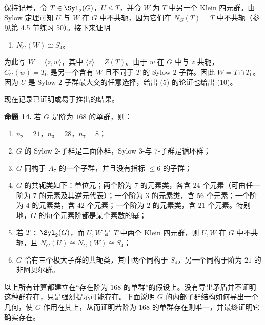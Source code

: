 保持记号，令 $T\in\Syl_2(G)$，$U\leq T$，并令 $W$ 为 $T$ 中另一个 Klein 四元群。由 Sylow 定理可知 $U$ 与 $W$ 在 $G$ 中不共轭，因为它们在 $N_G(T)=T$ 中不共轭（参见第 4.5 节练习 50）。接下来证明
\begin{enumerate}[label=(\arabic*),resume]
  \item $N_G(W)\cong S_4$。
\end{enumerate}
为此写 $W=\langle z,w\rangle$，其中 $\langle z\rangle=Z(T)$。由于 $w$ 在 $G$ 中与 $z$ 共轭，$C_G(w)=T_0$ 是另一个含有 $W$ 且不同于 $T$ 的 Sylow $2$-子群。因此 $W=T\cap T_0$。因为 $U$ 是 Sylow $2$-子群最大交的任意选择，给出 (5) 的论证也给出 (10)。

现在记录已证明或易于推出的结果。

\medskip
\noindent\textbf{命题 14.} 若 $G$ 是阶为 $168$ 的单群，则：
\begin{enumerate}[label=(\arabic*)]
  \item $n_2=21$，$n_3=28$，$n_7=8$；
  \item $G$ 的 Sylow $2$-子群是二面体群，Sylow $3$-与 $7$-子群是循环群；
  \item $G$ 同构于 $A_7$ 的一个子群，并且没有指标 $\leq6$ 的子群；
  \item $G$ 的共轭类如下：单位元；两个阶为 $7$ 的元素类，各含 $24$ 个元素（可由任一阶为 $7$ 的元素及其逆元代表）；一个阶为 $3$ 的元素类，含 $56$ 个元素；一个阶为 $4$ 的元素类，含 $42$ 个元素；一个阶为 $2$ 的元素类，含 $21$ 个元素。特别地，$G$ 的每个元素阶都是某个素数的幂；
  \item 若 $T\in\Syl_2(G)$，而 $U,W$ 是 $T$ 中两个 Klein 四元群，则 $U,W$ 在 $G$ 中不共轭，且 $N_G(U)\cong N_G(W)\cong S_4$；
  \item $G$ 恰有三个极大子群的共轭类，其中两个同构于 $S_4$，另一个同构于阶为 $21$ 的非阿贝尔群。
\end{enumerate}

以上所有计算都建立在“存在阶为 $168$ 的单群”的假设上。没有导出矛盾并不证明这种群存在，只是强烈提示可能存在。下面说明 $G$ 的内部子群结构如何导出一个几何，使 $G$ 作用在其上，从而证明若阶为 $168$ 的单群存在则唯一，并最终证明它确实存在。

